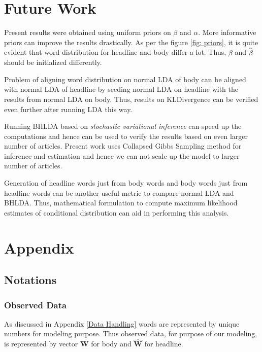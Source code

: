 \documentclass[a4paper]{article}
\begin{document}
\section{Future Work}
Present results were obtained using uniform priors on $\beta$ and $\alpha$. More informative priors can improve the results drastically. As per the figure \ref{fig: priors}, it is quite evident that word distribution for headline and body differ a lot. Thus, $\beta$ and $\hat{\beta}$ should be initialized differently. 

Problem of aligning word distribution on normal LDA of body can be aligned with normal LDA of headline by seeding normal LDA on headline with the results from normal LDA on body. Thus, results on KLDivergence can be verified even further after running LDA this way. 

Running BHLDA based on \emph{stochastic variational inference} can speed up the computations and hence can be used to verify the results based on even larger number of articles. Present work uses Collapsed Gibbs Sampling method for inference and estimation and hence we can not scale up the model to larger number of articles. 

Generation of headline words just from body words and body words just from headline words can be another useful metric to compare normal LDA and BHLDA. Thus, mathematical formulation to compute maximum likelihood estimates of conditional distribution can aid in performing this analysis. 


\section{Appendix}

\subsection{Notations} \label{notations}
\subsubsection{Observed Data}
As discussed in Appendix \ref{Data Handling} words are represented by unique numbers for modeling purpose. Thus observed data, for purpose of our modeling, is represented by vector \textbf{W} for body and $\mathbf{\hat{W}}$ for headline. 
\end{document}
